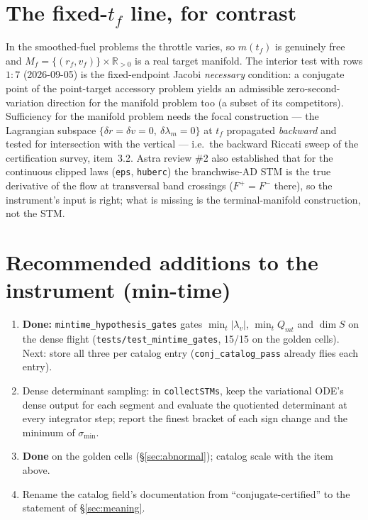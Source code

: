 \documentclass[11pt]{article}
\theoremstyle{definition}
\newcommand{\R}{\mathbb{R}}
\newcommand{\lv}{\lambda_v}
\newcommand{\lm}{\lambda_m}
\newcommand{\tf}{t_f}
\begin{document}
\section{The fixed-$\tf$ line, for contrast}\label{sec:fixedtf}
In the smoothed-fuel problems the throttle varies, so $m(\tf)$ is genuinely free
and $M_f=\{(r_f,v_f)\}\times\R_{>0}$ is a real target manifold. The interior test
with rows $1{:}7$ (2026-09-05) is the fixed-endpoint Jacobi \emph{necessary}
condition: a conjugate point of the point-target accessory problem yields an
admissible zero-second-variation direction for the manifold problem too (a
subset of its competitors). Sufficiency for the manifold problem needs the focal
construction --- the Lagrangian subspace $\{\delta r=\delta v=0,\ \delta\lm=0\}$
at $\tf$ propagated \emph{backward} and tested for intersection with the vertical
--- i.e.\ the backward Riccati sweep of the certification survey, item~3.2.
Astra review \#2 also established that for the continuous clipped laws
(\texttt{eps}, \texttt{huberc}) the branchwise-AD STM is the true derivative of
the flow at transversal band crossings ($F^+=F^-$ there), so the instrument's
input is right; what is missing is the terminal-manifold construction, not the
STM.

\section{Recommended additions to the instrument (min-time)}
\begin{enumerate}
\item \textbf{Done:} \texttt{mintime\_hypothesis\_gates} gates $\min_t|\lv|$,
$\min_t Q_{mt}$ and $\dim S$ on the dense flight (\texttt{tests/test\_mintime\_gates},
15/15 on the golden cells). Next: store all three per catalog entry
(\texttt{conj\_catalog\_pass} already flies each entry).
\item Dense determinant sampling: in \texttt{collectSTMs}, keep the variational
ODE's dense output for each segment and evaluate the quotiented determinant at
every integrator step; report the finest bracket of each sign change and the
minimum of $\sigma_{\min}$.
\item \textbf{Done} on the golden cells (\S\ref{sec:abnormal}); catalog scale
with the item above.
\item Rename the catalog field's documentation from ``conjugate-certified'' to
the statement of \S\ref{sec:meaning}.
\end{enumerate}
\end{document}
